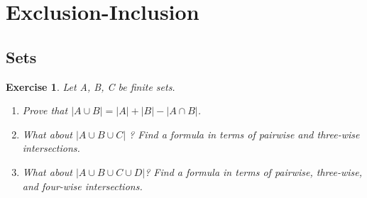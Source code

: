 \documentclass[12pt,a4]{article}
\theoremstyle{exercise}
\newtheorem{exercise}[theorem]{Exercise}
\begin{document}
\section{Exclusion-Inclusion}

\subsection{Sets}

\begin{exercise}
Let A, B, C be ﬁnite sets.
\begin{enumerate}

\item Prove that $\left\vert{A \cup B}\right\vert =  \left\vert{A}\right\vert + \left\vert{B}\right\vert - \left\vert{A\cap B}\right\vert$.
\item What about $\left\vert{A\cup B\cup C}\right\vert$ ? Find a formula in terms of pairwise and three-wise intersections.

\item What about $\left\vert{A\cup B\cup C \cup D}\right\vert$? Find a formula in terms of pairwise, three-wise, and four-wise intersections.
\end{enumerate}
\end{exercise}
\end{document}

